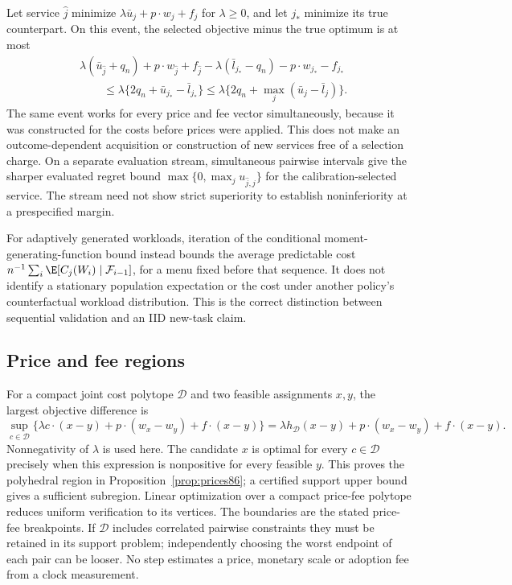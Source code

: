 Let service $\widehat j$ minimize $\lambda\bar u_j+p\cdot w_j+f_j$ for $\lambda\ge0$, and let $j_*$ minimize its true counterpart. On this event, the selected objective minus the true optimum is at most
\begin{align*}
 &\lambda(\bar u_{\widehat j}+q_n)+p\cdot w_{\widehat j}+f_{\widehat j}
 -\lambda(\bar l_{j_*}-q_n)-p\cdot w_{j_*}-f_{j_*}\\
 &\hspace{25pt}\le\lambda\{2q_n+\bar u_{j_*}-\bar l_{j_*}\}
 \le\lambda\{2q_n+\max_j(\bar u_j-\bar l_j)\}.
\end{align*}
The same event works for every price and fee vector simultaneously, because it was constructed for the costs before prices were applied. This does not make an outcome-dependent acquisition or construction of new services free of a selection charge. On a separate evaluation stream, simultaneous pairwise intervals give the sharper evaluated regret bound $\max\{0,\max_j u_{\widehat j,j}\}$ for the calibration-selected service. The stream need not show strict superiority to establish noninferiority at a prespecified margin.

For adaptively generated workloads, iteration of the conditional moment-generating-function bound instead bounds the average predictable cost $n^{-1}\sum_i\E[C_j(W_i)\mid\mathcal F_{i-1}]$, for a menu fixed before that sequence. It does not identify a stationary population expectation or the cost under another policy's counterfactual workload distribution. This is the correct distinction between sequential validation and an IID new-task claim.

\subsection{Price and fee regions}
For a compact joint cost polytope $\mathcal D$ and two feasible assignments $x,y$, the largest objective difference is
\[
 \sup_{c\in\mathcal D}\{\lambda c\cdot(x-y)+p\cdot(w_x-w_y)+f\cdot(x-y)\}
 =\lambda h_{\mathcal D}(x-y)+p\cdot(w_x-w_y)+f\cdot(x-y).
\]
Nonnegativity of $\lambda$ is used here. The candidate $x$ is optimal for every $c\in\mathcal D$ precisely when this expression is nonpositive for every feasible $y$. This proves the polyhedral region in Proposition~\ref{prop:prices86}; a certified support upper bound gives a sufficient subregion. Linear optimization over a compact price-fee polytope reduces uniform verification to its vertices. The boundaries are the stated price-fee breakpoints. If $\mathcal D$ includes correlated pairwise constraints they must be retained in its support problem; independently choosing the worst endpoint of each pair can be looser. No step estimates a price, monetary scale or adoption fee from a clock measurement.
